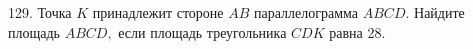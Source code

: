 129. Точка $K$ принадлежит стороне $AB$ параллелограмма $ABCD.$ Найдите площадь $ABCD,$ если площадь треугольника $CDK$ равна 28.\\
